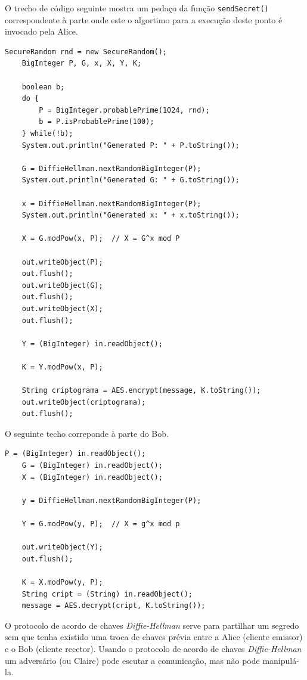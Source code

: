 O trecho de código seguinte mostra um pedaço da função \texttt{sendSecret()} correspondente à parte onde este o algortimo para a execução deste ponto é invocado pela Alice. 
\begin{lstlisting}[caption=Trecho de código usado no projeto.]  
    SecureRandom rnd = new SecureRandom();
    BigInteger P, G, x, X, Y, K;
    
    boolean b;
    do {
        P = BigInteger.probablePrime(1024, rnd);
        b = P.isProbablePrime(100);
    } while(!b);
    System.out.println("Generated P: " + P.toString());
    
    G = DiffieHellman.nextRandomBigInteger(P);
    System.out.println("Generated G: " + G.toString());
    
    x = DiffieHellman.nextRandomBigInteger(P);
    System.out.println("Generated x: " + x.toString());
    
    X = G.modPow(x, P);  // X = G^x mod P
    
    out.writeObject(P);
    out.flush();
    out.writeObject(G);
    out.flush();
    out.writeObject(X);
    out.flush();
            
    Y = (BigInteger) in.readObject();
    
    K = Y.modPow(x, P);
    
    String criptograma = AES.encrypt(message, K.toString());
    out.writeObject(criptograma);
    out.flush();
\end{lstlisting}
O seguinte techo correponde à parte do Bob.
\begin{lstlisting}[caption=Trecho de código usado no projeto.]
    P = (BigInteger) in.readObject();
    G = (BigInteger) in.readObject();
    X = (BigInteger) in.readObject();

    y = DiffieHellman.nextRandomBigInteger(P);

    Y = G.modPow(y, P);  // X = g^x mod p
    
    out.writeObject(Y);
    out.flush();
    
    K = X.modPow(y, P);
    String cript = (String) in.readObject();
    message = AES.decrypt(cript, K.toString());
\end{lstlisting}

O protocolo de acordo de chaves \textit{Diffie-Hellman} serve para  partilhar um segredo sem que tenha existido uma troca de chaves prévia entre a Alice (cliente emissor) e o Bob (cliente recetor). Usando o protocolo de acordo de chaves \textit{Diffie-Hellman} um adversário (ou Claire) pode escutar a comunicação, mas não pode manipulá-la.   
